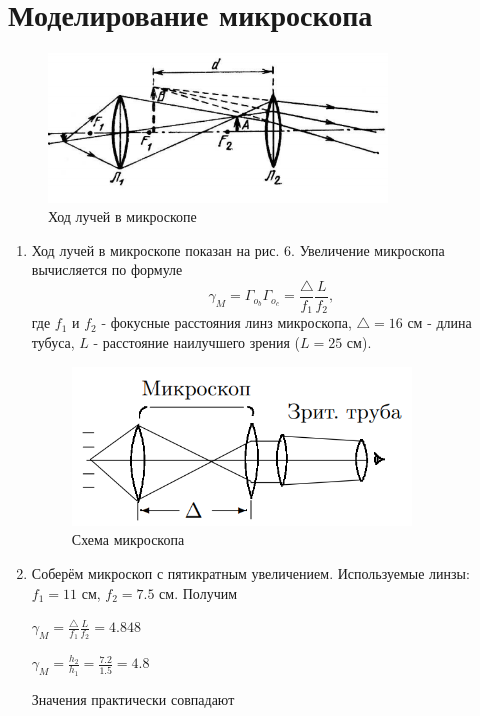 \documentclass[a4paper]{article}
\begin{document}
\section{Моделирование микроскопа}

    \begin{figure}[h]
    \centering
    \includegraphics[width=9cm]{micro.PNG}
    \caption{Ход лучей в микроскопе}
    \label{fig:vac}
\end{figure}

\begin{enumerate}
    \item Ход лучей в микроскопе показан на рис. 6. Увеличение микроскопа вычисляется по формуле
    \begin{equation}
        \gamma_M = \Gamma_o_b \Gamma_o_c = \frac{\triangle}{f_1} \frac{L}{f_2},
    \end{equation}
    где $f_1$ и $f_2$ - фокусные расстояния линз микроскопа, $\triangle = 16$ см - длина тубуса, $L$ - расстояние наилучшего зрения ($L = 25$ см).
    
    \begin{figure}[h]
    \centering
    \includegraphics[width=9cm]{micro_2.PNG}
    \caption{Схема микроскопа}
    \label{fig:vac}
\end{figure}    
    
    \item Соберём микроскоп с пятикратным увеличением. Используемые линзы: $f_1 = 11$ см, $f_2 = 7.5$ см. Получим
    \begin{center}
        $\gamma_M = \frac{\triangle}{f_1} \frac{L}{f_2} = 4.848$ \par
        $\gamma_M = \frac{h_2}{h_1} = \frac{7.2}{1.5} = 4.8$
    \end{center}
Значения практически совпадают
\end{enumerate}
\end{document}
